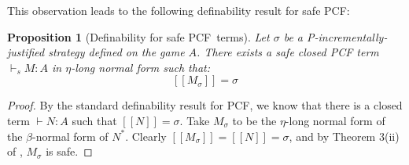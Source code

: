 \documentclass{article}
\newcommand{\sem}[1]{{[\![ #1 ]\!]}}
\newcommand\pcf{\textsf{PCF}}
\newtheorem{proposition}{Proposition}[section]
\theoremstyle{remark}
\theoremstyle{definition}
\begin{document}
This observation leads to the following definability result for safe \pcf:
\begin{proposition}[Definability for safe \pcf\ terms]
\label{prop:safetydefinability}
Let $\sigma$ be a P-incrementally-justified strategy defined on the game $A$. There exists a \emph{safe} closed PCF term $\vdash_s M : A$ in $\eta$-long normal form such that:
$$ \sem{M_\sigma} = \sigma $$
\end{proposition}
\begin{proof}
By the standard definability result for PCF, we know that there is a closed term $\vdash N : A$ such that $\sem{N} = \sigma$.
Take $M_\sigma$ to be the $\eta$-long normal form of the $\beta$-normal form of $N^*$.
Clearly $\sem{ M_\sigma} = \sem{N} = \sigma$, and by Theorem 3(ii) of \cite{blumong:safelambdacalculus}, $M_\sigma$ is safe.
\end{proof}






\end{document}
